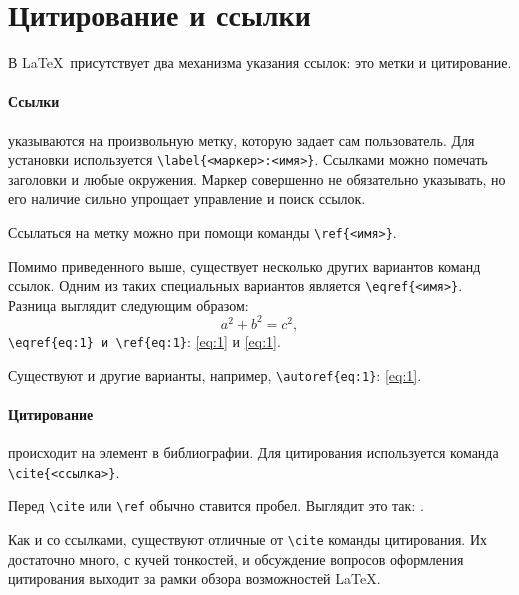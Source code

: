 
\section{Цитирование и ссылки}
В \LaTeX~присутствует два механизма указания ссылок: это метки и цитирование. 

\paragraph{Ссылки} указываются на произвольную метку, которую задает сам пользователь. Для установки используется \verb+\label{<маркер>:<имя>}+. Ссылками можно помечать заголовки и любые окружения. 
Маркер совершенно не обязательно указывать, но его наличие сильно упрощает управление и поиск ссылок. 

Ссылаться на метку можно при помощи команды \verb+\ref{<имя>}+.

Помимо приведенного выше, существует несколько других вариантов команд ссылок. Одним из таких специальных вариантов является \verb+\eqref{<имя>}+. Разница выглядит следующим образом:
\begin{equation}\label{eq:1}
    a^2+b^2=c^2, 
\end{equation}
\verb+\eqref{eq:1} и \ref{eq:1}+: \eqref{eq:1} и \ref{eq:1}.

Существуют и другие варианты, например, \verb+\autoref{eq:1}+: \autoref{eq:1}.

\paragraph{Цитирование} происходит на элемент в библиографии. Для цитирования используется команда \verb+\cite{<ссылка>}+. 

Перед \verb+\cite+ или \verb+\ref+ обычно ставится пробел. Выглядит это так: \cite{test}.

Как и со ссылками, существуют отличные от \verb+\cite+ команды цитирования. Их достаточно много, с кучей тонкостей, и обсуждение вопросов оформления цитирования выходит за рамки обзора возможностей \LaTeX.


